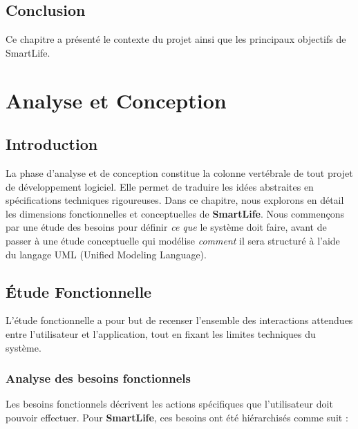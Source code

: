 \documentclass[12pt,a4paper,oneside]{report}
\begin{document}
    \section*{Conclusion}

    Ce chapitre a présenté le contexte du projet ainsi que les principaux objectifs de SmartLife.

    \chapter{Analyse et Conception}

    \section*{Introduction}

    La phase d'analyse et de conception constitue la colonne vertébrale de tout projet de développement logiciel. Elle permet de traduire les idées abstraites en spécifications techniques rigoureuses. Dans ce chapitre, nous explorons en détail les dimensions fonctionnelles et conceptuelles de \textbf{SmartLife}. Nous commençons par une étude des besoins pour définir \textit{ce que} le système doit faire, avant de passer à une étude conceptuelle qui modélise \textit{comment} il sera structuré à l'aide du langage UML (Unified Modeling Language).

    \section{Étude Fonctionnelle}

    L'étude fonctionnelle a pour but de recenser l'ensemble des interactions attendues entre l'utilisateur et l'application, tout en fixant les limites techniques du système.

    \subsection{Analyse des besoins fonctionnels}

    Les besoins fonctionnels décrivent les actions spécifiques que l'utilisateur doit pouvoir effectuer. Pour \textbf{SmartLife}, ces besoins ont été hiérarchisés comme suit :
\end{document}
